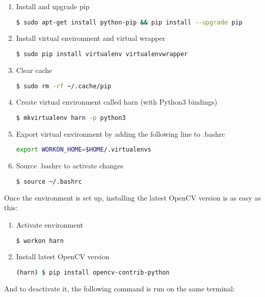 \begin{enumerate}
  \item Install and upgrade pip
  	\begin{lstlisting}[language=bash]
    	$ sudo apt-get install python-pip && pip install --upgrade pip
	\end{lstlisting}
  \item Install virtual environment and virtual wrapper
  	\begin{lstlisting}[language=bash]
    	$ sudo pip install virtualenv virtualenvwrapper
	\end{lstlisting}
  \item Clear cache
  	\begin{lstlisting}[language=bash]
    	$ sudo rm -rf ~/.cache/pip
	\end{lstlisting}
  \item Create virtual environment called harn (with Python3 bindings)
  	\begin{lstlisting}[language=bash]
    	$ mkvirtualenv harn -p python3
	\end{lstlisting}
  \item Export virtual environment by adding the following line to .bashrc
  	\begin{lstlisting}[language=bash]
    	export WORKON_HOME=$HOME/.virtualenvs
	\end{lstlisting}
  \item Source .bashrc to activate changes
  	\begin{lstlisting}[language=bash]
    	$ source ~/.bashrc
	\end{lstlisting}
\end{enumerate}

Once the environment is set up, installing the latest OpenCV version is as easy as this:

\begin{enumerate}
  \item Activate environment
  	\begin{lstlisting}[language=bash]
    	$ workon harn
	\end{lstlisting}
  \item Install latest OpenCV version
  	\begin{lstlisting}[language=bash]
    	(harn) $ pip install opencv-contrib-python
	\end{lstlisting}
\end{enumerate}

And to deactivate it, the following command is run on the same terminal:

